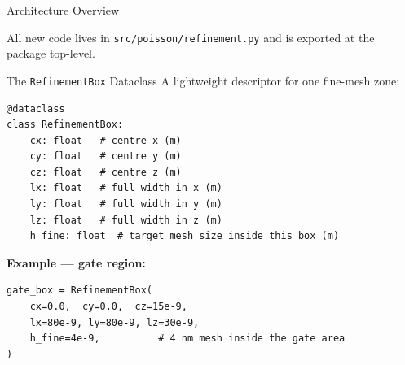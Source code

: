 \documentclass[aspectratio=169]{beamer}
\begin{document}
\begin{frame}{Architecture Overview}
  \begin{center}
  \end{center}

  \vspace{0.4em}
  All new code lives in \texttt{src/poisson/refinement.py} and is exported
  at the package top-level.
\end{frame}

\begin{frame}[fragile]{The \texttt{RefinementBox} Dataclass}
  A lightweight descriptor for one fine-mesh zone:

  \begin{lstlisting}[style=pysmall]
@dataclass
class RefinementBox:
    cx: float   # centre x (m)
    cy: float   # centre y (m)
    cz: float   # centre z (m)
    lx: float   # full width in x (m)
    ly: float   # full width in y (m)
    lz: float   # full width in z (m)
    h_fine: float  # target mesh size inside this box (m)
  \end{lstlisting}

  \vspace{0.5em}
  \textbf{Example — gate region:}
  \begin{lstlisting}[style=pysmall]
gate_box = RefinementBox(
    cx=0.0,  cy=0.0,  cz=15e-9,
    lx=80e-9, ly=80e-9, lz=30e-9,
    h_fine=4e-9,          # 4 nm mesh inside the gate area
)
  \end{lstlisting}
\end{frame}
\end{document}
